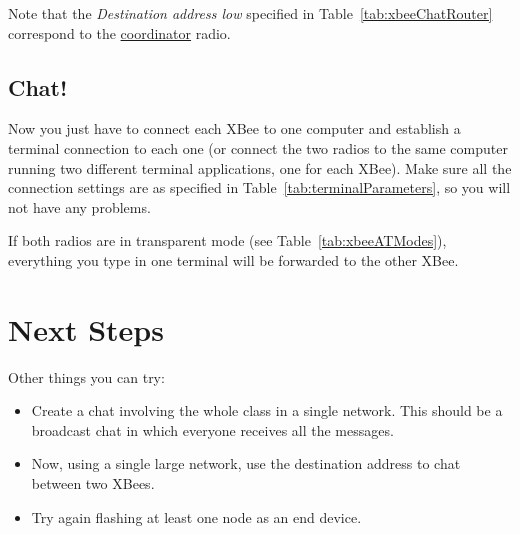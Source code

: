\begin{table}[htbp]
	\centering
	\caption{XBee router settings for simple chat}
	\label{tab:xbeeChatRouter}
\end{table}

Note that the \emph{Destination address low} specified in Table~\ref{tab:xbeeChatRouter} correspond to the \underline{coordinator} radio.

\subsection{Chat!}
Now you just have to connect each XBee to one computer and establish a terminal connection to each one (or connect the two radios to the same computer running two different terminal applications, one for each XBee). Make sure all the connection settings are as specified in Table~\ref{tab:terminalParameters}, so you will not have any problems.

If both radios are in transparent mode (see Table~\ref{tab:xbeeATModes}), everything you type in one terminal will be forwarded to the other XBee.

\section{Next Steps}

Other things you can try:

\begin{itemize}
\item Create a chat involving the whole class in a single network.
This should be a broadcast chat in which everyone receives all the messages.
\item Now, using a single large network, use the destination address to chat between two XBees.
\item  Try again flashing at least one node as an end device.
\end{itemize}
